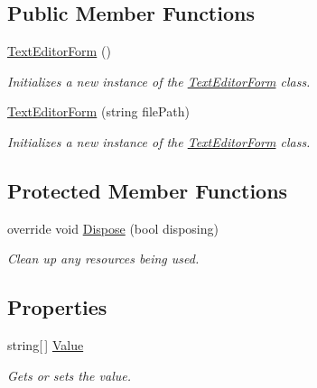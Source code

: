 \subsection*{Public Member Functions}
\begin{DoxyCompactItemize}
\item 
\hyperlink{class_a_rdev_kit_1_1_text_editor_form_a41d9e642c73b54ff0d550107cb7d3638}{Text\-Editor\-Form} ()
\begin{DoxyCompactList}\small\item\em Initializes a new instance of the \hyperlink{class_a_rdev_kit_1_1_text_editor_form}{Text\-Editor\-Form} class. \end{DoxyCompactList}\item 
\hyperlink{class_a_rdev_kit_1_1_text_editor_form_a4a118dd5f3bbf9e0180581d204ad300a}{Text\-Editor\-Form} (string file\-Path)
\begin{DoxyCompactList}\small\item\em Initializes a new instance of the \hyperlink{class_a_rdev_kit_1_1_text_editor_form}{Text\-Editor\-Form} class. \end{DoxyCompactList}\end{DoxyCompactItemize}
\subsection*{Protected Member Functions}
\begin{DoxyCompactItemize}
\item 
override void \hyperlink{class_a_rdev_kit_1_1_text_editor_form_a292d1049568723cd7888b31585665553}{Dispose} (bool disposing)
\begin{DoxyCompactList}\small\item\em Clean up any resources being used. \end{DoxyCompactList}\end{DoxyCompactItemize}
\subsection*{Properties}
\begin{DoxyCompactItemize}
\item 
string\mbox{[}$\,$\mbox{]} \hyperlink{class_a_rdev_kit_1_1_text_editor_form_aa0db7b9352834eda621de3e4de359fc1}{Value}
\begin{DoxyCompactList}\small\item\em Gets or sets the value. \end{DoxyCompactList}\end{DoxyCompactItemize}


